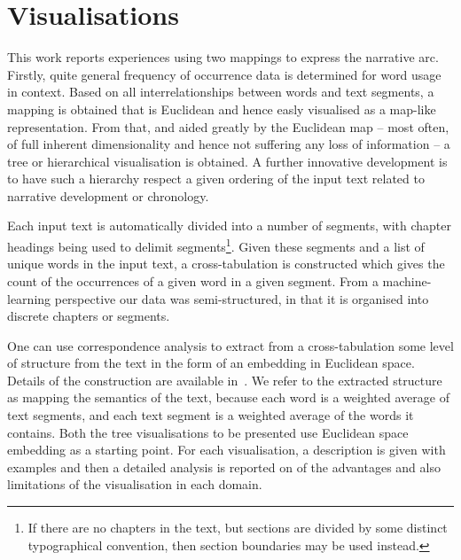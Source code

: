 \documentclass{article}
\begin{document}
\section{Visualisations}

This work reports experiences using two mappings to express the narrative arc.  Firstly, quite general frequency of occurrence data is determined for word usage in context.  Based on all interrelationships between words and text segments, a mapping is obtained that is Euclidean and hence easly visualised as a map-like representation.  From that, and aided greatly by the Euclidean map -- most often, of full inherent dimensionality and hence not suffering any loss of information -- a tree or hierarchical visualisation is obtained.  A further innovative development is to have such a hierarchy respect a given ordering of the input text related to narrative development or chronology.

Each input text is automatically divided into a number of segments, with chapter headings being used to delimit segments\footnote{If there are no chapters in the text, but sections are divided by some distinct typographical convention, then section boundaries may be used instead.}. Given these segments and a list of unique words in the input text, a cross-tabulation is constructed which gives the count of the occurrences of a given word in a given segment.    From a machine-learning perspective our data was semi-structured, in that it is organised into discrete chapters or segments.  

One can use correspondence analysis to extract from a cross-tabulation some level of structure from the text in the form of an embedding in Euclidean space. Details of the construction are available in~\cite{murtagh2011,Murtagh2009302}. We refer to the extracted structure as mapping the semantics of the text, because each word is a weighted average of text segments, and each text segment is a weighted average of the words it contains. Both the tree visualisations to be presented use Euclidean space embedding as a starting point.  For each visualisation, a description is given with examples and then a detailed analysis is reported on of the advantages and also limitations of the visualisation in each domain.
\end{document}
